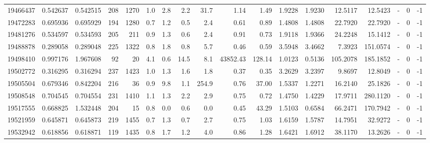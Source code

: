 \begin{tabular}{rrrrrrrrrrrrrrrlrr}
  19466437 & 0.542637 &   0.542515 &  208 & 1270 &      1.0 &      2.8 &     2.2 &     31.7 &       1.14 &        1.49 &  1.9228 &  1.9230 &   12.5117 &   12.5423 &             - &        0 &         -1 \\
  19472283 & 0.695936 &   0.695929 &  194 & 1280 &      0.7 &      1.2 &     0.5 &      2.4 &       0.61 &        0.89 &  1.4808 &  1.4808 &   22.7920 &   22.7920 &             - &        0 &         -1 \\
  19481276 & 0.534597 &   0.534593 &  205 &  211 &      0.9 &      1.3 &     0.6 &      2.4 &       0.91 &        0.73 &  1.9118 &  1.9366 &   24.2248 &   15.1412 &             - &        0 &         -1 \\
  19488878 & 0.289058 &   0.289048 &  225 & 1322 &      0.8 &      1.8 &     0.8 &      5.7 &       0.46 &        0.59 &  3.5948 &  3.4662 &    7.3923 &  151.0574 &             - &        0 &         -1 \\
  19498410 & 0.997176 &   1.967608 &   92 &   20 &      4.1 &      0.6 &    14.5 &      8.1 &   43852.43 &      128.14 &  1.0123 &  0.5136 &  105.2078 &  185.1852 &             - &        0 &         -1 \\
  19502772 & 0.316295 &   0.316294 &  237 & 1423 &      1.0 &      1.3 &     1.6 &      1.8 &       0.37 &        0.35 &  3.2629 &  3.2397 &    9.8697 &   12.8049 &             - &        0 &         -1 \\
  19505504 & 0.679346 &   0.842204 &  216 &   36 &      0.9 &      9.8 &     1.1 &    254.9 &       0.76 &       37.00 &  1.5337 &  1.2271 &   16.2140 &   25.1826 &             - &        0 &         -1 \\
  19508548 & 0.704545 &   0.704554 &  231 & 1410 &      1.1 &      1.3 &     2.2 &      2.9 &       0.75 &        0.72 &  1.4750 &  1.4229 &   17.9711 &  280.1120 &             - &        0 &         -1 \\
  19517555 & 0.668825 &   1.532448 &  204 &   15 &      0.8 &      0.0 &     0.6 &      0.0 &       0.45 &       43.29 &  1.5103 &  0.6584 &   66.2471 &  170.7942 &             - &        0 &         -1 \\
  19521959 & 0.645871 &   0.645873 &  219 & 1455 &      0.7 &      1.3 &     0.7 &      2.7 &       0.75 &        1.03 &  1.6159 &  1.5787 &   14.7951 &   32.9272 &             - &        0 &         -1 \\
  19532942 & 0.618856 &   0.618871 &  119 & 1435 &      0.8 &      1.7 &     1.2 &      4.0 &       0.86 &        1.28 &  1.6421 &  1.6912 &   38.1170 &   13.2626 &             - &        0 &         -1 \\

\end{tabular}
